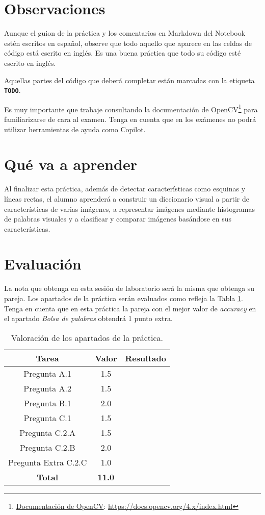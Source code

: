 \section{Observaciones}

Aunque el guion de la práctica y los comentarios en Markdown del Notebook estén escritos en español, observe que todo aquello que aparece en las celdas de código está escrito en inglés. Es una buena práctica que todo su código esté escrito en inglés.

Aquellas partes del código que deberá completar están marcadas con la etiqueta \textbf{\texttt{TODO}}.

Es muy importante que trabaje consultando la documentación de OpenCV\footnote{\href{https://docs.opencv.org/4.x/index.html}{Documentación de OpenCV}: \url{https://docs.opencv.org/4.x/index.html}} para familiarizarse de cara al examen. Tenga en cuenta que en los exámenes no podrá utilizar herramientas de ayuda como Copilot.

\section{Qué va a aprender}

Al finalizar esta práctica, además de detectar características como esquinas y líneas rectas, el alumno aprenderá a construir un diccionario visual a partir de características de varias imágenes, a representar imágenes mediante histogramas de palabras visuales y a clasificar y comparar imágenes basándose en sus características. 

\section{Evaluación}

La nota que obtenga en esta sesión de laboratorio será la misma que obtenga su pareja. Los apartados de la práctica serán evaluados como refleja la Tabla \ref{table:evaluacion}. Tenga en cuenta que en esta práctica la pareja con el mejor valor de \textit{accuracy} en el apartado \textit{Bolsa de palabras} obtendrá 1 punto extra.

\begin{table}[h!]
    \centering
    \begin{tabular}{|c|c|c|}
    \hline
    \textbf{Tarea} & \textbf{Valor} & \textbf{Resultado} \\
    \hline
    Pregunta A.1 & 1.5 & \\
    \hline
    Pregunta A.2 & 1.5 & \\
    \hline
    Pregunta B.1 & 2.0 & \\
    \hline
    Pregunta C.1 & 1.5 & \\
    \hline
    Pregunta C.2.A & 1.5 & \\
    \hline
    Pregunta C.2.B & 2.0 & \\
    \hline
    Pregunta Extra C.2.C & 1.0 & \\
    \hline
    \textbf{Total} & \textbf{11.0} & \\
    \hline
    \end{tabular}
    \caption{Valoración de los apartados de la práctica.}
    \label{table:evaluacion}
\end{table}
